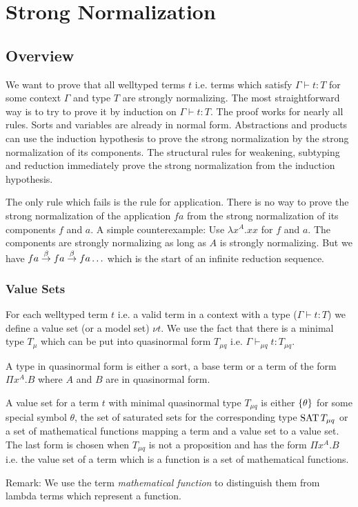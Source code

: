 \section{Strong Normalization}


\subsection{Overview}

We want to prove that all welltyped terms $t$ i.e. terms which satisfy $\Gamma
\vdash t: T$ for some context $\Gamma$ and type $T$ are strongly normalizing.
The most straightforward way is to try to prove it by induction on $\Gamma
\vdash t: T$. The proof works for nearly all rules. Sorts and variables are
already in normal form. Abstractions and products can use the induction
hypothesis to prove the strong normalization by the strong normalization of its
components. The structural rules for weakening, subtyping and reduction
immediately prove the strong normalization from the induction hypothesis.

The only rule which fails is the rule for application. There is no way to prove
the strong normalization of the application $f a$ from the strong normalization
of its components $f$ and $a$. A simple counterexample: Use $\lambda x^A. x x$
for $f$ and $a$. The components are strongly normalizing as long as $A$ is
strongly normalizing. But we have $f a \stackrel{\beta}{\to} f a \stackrel{\beta}{\to} f a \ldots$ which is
the start of an infinite reduction sequence.



\subsubsection{Value Sets}

For each welltyped term $t$ i.e. a valid term in a context with a type ($\Gamma
\vdash t: T$) we define a value set (or a model set) $\nu t$. We use the fact
that there is a minimal type $T_\mu$ which can be put into quasinormal form
$T_{\mu q}$ i.e.  $\Gamma \vdash_{\mu q} t: T_{\mu q}$.

A type in quasinormal form is either a sort, a base term or a term of the form
$\Pi x^A. B$ where $A$ and $B$ are in quasinormal form.

A value set for a term $t$ with minimal quasinormal type $T_{\mu q}$ is either
${\{\theta\}}$ for some special symbol $\theta$, the set of saturated sets for
the corresponding type $\text{SAT}\, T_{\mu q}$ or a set of mathematical functions
mapping a term and a value set to a value set. The last form is chosen when
$T_{\mu q}$ is not a proposition and has the form $\Pi x^A. B$ i.e. the value
set of a term which is a function is a set of mathematical functions.

Remark: We use the term \emph{mathematical function} to distinguish them from
lambda terms which represent a function.





